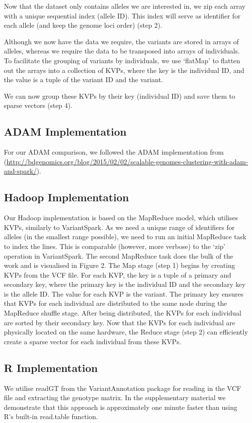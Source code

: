 \documentclass{bmcart}
\newcommand{\variantSpark}{{\sc VariantSpark}}
\begin{document}
Now that the dataset only contains alleles we are interested in, we zip each array with a unique sequential index (allele ID). This index will serve
as identifier for each allele (and keep the genome loci order) (step 2).

Although we now have the data we require, the variants are stored in arrays of alleles, whereas we require the data to be transposed into arrays of individuals.
To facilitate the grouping of variants by individuals, we use `flatMap' to flatten out the arrays into a collection of KVPs, where the key is the individual ID, and the
value is a tuple of the variant ID and the variant.

We can now group these KVPs by their key (individual ID) and save them to sparse vectors (step 4).


\subsection*{{\sc ADAM} Implementation}
For our {\sc ADAM} comparison, we followed the {\sc ADAM} implementation from (\url{http://bdgenomics.org/blog/2015/02/02/scalable-genomes-clustering-with-adam-and-spark/}).

\subsection*{Hadoop Implementation}
Our Hadoop implementation is based on the MapReduce model, which utilises KVPs, similarly to \variantSpark{}.
As we need a unique range of identifiers for alleles (in the smallest range possible), we need to run an initial MapReduce task to index the lines. This is comparable (however, more verbose) to the `zip' operation in \variantSpark{}.
The second MapReduce task does the bulk of the work and is visualised in Figure 2. The Map stage (step 1) begins by creating KVPs from the VCF file. For each KVP, the key is a tuple of a primary and secondary key, where the primary key is the individual ID and the secondary key is the allele ID. The value for each KVP is the variant.
The primary key ensures that KVPs for each individual are distributed to the same node during the MapReduce shuffle stage. After being distributed, the KVPs for each individual are sorted by their secondary key.
Now that the KVPs for each individual are physically located on the same hardware, the Reduce stage (step 2) can efficiently create a sparse vector for each individual from these KVPs. 

\subsection*{R Implementation}
We utilise {\sc readGT} from the {\sc VariantAnnotation} package for reading in the VCF file and extracting the genotype matrix.
In the supplementary material we demonstrate that this approach is approximately one minute faster than using R's built-in {\sc read.table} function.
\end{document}
